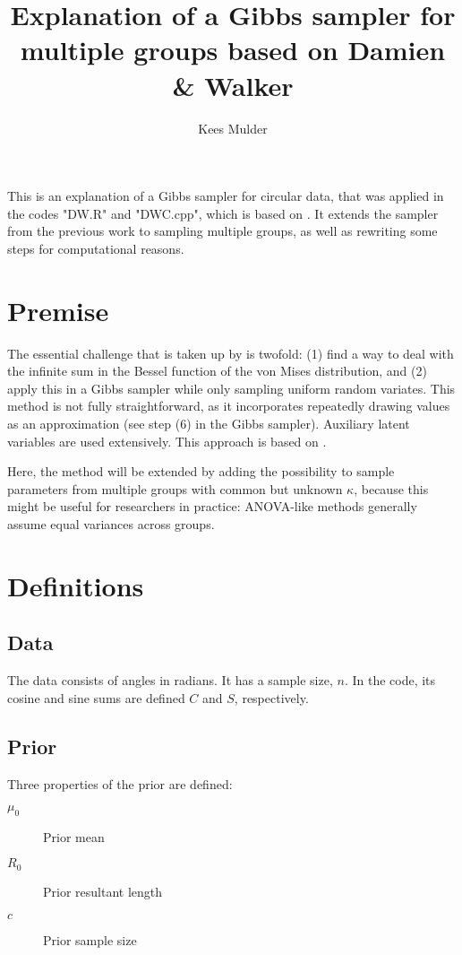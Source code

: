 \documentclass[12pt,a4paper]{article}
\author{Kees Mulder}
\title{Explanation of a Gibbs sampler for multiple groups based on Damien \& Walker}
\begin{document}
\maketitle

This is an explanation of a Gibbs sampler for circular data, that was applied in the codes "DW.R" and "DWC.cpp", which is based on \citet{damien1999fullbayes}. It extends the sampler from the previous work to sampling multiple groups, as well as rewriting some steps for computational reasons. 

\section{Premise}

The essential challenge that is taken up by \citet{damien1999fullbayes} is twofold: (1) find a way to deal with the infinite sum in the Bessel function of the von Mises distribution, and (2) apply this in a Gibbs sampler while only sampling uniform random variates. This method is not fully straightforward, as it incorporates repeatedly drawing values as an approximation (see step (6) in the Gibbs sampler). Auxiliary latent variables are used extensively. This approach is based on \citet{damlen1999auxiliary}. 

Here, the method will be extended by adding the possibility to sample parameters from multiple groups with common but unknown $\kappa$, because this might be useful for researchers in practice: ANOVA-like methods generally assume equal variances across groups. 

\section{Definitions}

\subsection{Data}

The data consists of angles in radians. It has a sample size, $n$. In the code, its cosine and sine sums are defined $C$ and $S$, respectively.

\subsection{Prior}

Three properties of the prior are defined:

\begin{description}
\item[$\mu_0$] Prior mean
\item[$R_0$] Prior resultant length
\item[$c$] Prior sample size
\end{description}
\end{document}
